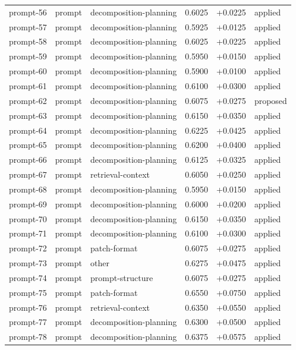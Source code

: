 \begin{center}
\begin{longtable}{llp{5.2cm}rrl}
prompt-56 & prompt & decomposition-planning & 0.6025 & +0.0225 & applied \\
prompt-57 & prompt & decomposition-planning & 0.5925 & +0.0125 & applied \\
prompt-58 & prompt & decomposition-planning & 0.6025 & +0.0225 & applied \\
prompt-59 & prompt & decomposition-planning & 0.5950 & +0.0150 & applied \\
prompt-60 & prompt & decomposition-planning & 0.5900 & +0.0100 & applied \\
prompt-61 & prompt & decomposition-planning & 0.6100 & +0.0300 & applied \\
prompt-62 & prompt & decomposition-planning & 0.6075 & +0.0275 & proposed \\
prompt-63 & prompt & decomposition-planning & 0.6150 & +0.0350 & applied \\
prompt-64 & prompt & decomposition-planning & 0.6225 & +0.0425 & applied \\
prompt-65 & prompt & decomposition-planning & 0.6200 & +0.0400 & applied \\
prompt-66 & prompt & decomposition-planning & 0.6125 & +0.0325 & applied \\
prompt-67 & prompt & retrieval-context & 0.6050 & +0.0250 & applied \\
prompt-68 & prompt & decomposition-planning & 0.5950 & +0.0150 & applied \\
prompt-69 & prompt & decomposition-planning & 0.6000 & +0.0200 & applied \\
prompt-70 & prompt & decomposition-planning & 0.6150 & +0.0350 & applied \\
prompt-71 & prompt & decomposition-planning & 0.6100 & +0.0300 & applied \\
prompt-72 & prompt & patch-format & 0.6075 & +0.0275 & applied \\
prompt-73 & prompt & other & 0.6275 & +0.0475 & applied \\
prompt-74 & prompt & prompt-structure & 0.6075 & +0.0275 & applied \\
prompt-75 & prompt & patch-format & 0.6550 & +0.0750 & applied \\
prompt-76 & prompt & retrieval-context & 0.6350 & +0.0550 & applied \\
prompt-77 & prompt & decomposition-planning & 0.6300 & +0.0500 & applied \\
prompt-78 & prompt & decomposition-planning & 0.6375 & +0.0575 & applied \\

\end{longtable}
\end{center}
